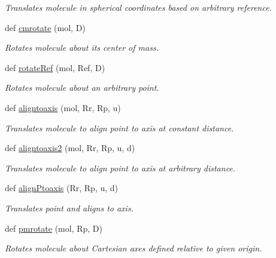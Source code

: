\begin{DoxyCompactItemize}
\begin{DoxyCompactList}\small\item\em Translates molecule in spherical coordinates based on arbitrary reference. \end{DoxyCompactList}\item 
def \hyperlink{namespacemolSimplify_1_1Scripts_1_1geometry_a891c57b819e0c6b2a00e9a495fc0dac9}{cmrotate} (mol, D)
\begin{DoxyCompactList}\small\item\em Rotates molecule about its center of mass. \end{DoxyCompactList}\item 
def \hyperlink{namespacemolSimplify_1_1Scripts_1_1geometry_ac0753e6f8d4fa1b2193cdbf99e3d1c8b}{rotate\+Ref} (mol, Ref, D)
\begin{DoxyCompactList}\small\item\em Rotates molecule about an arbitrary point. \end{DoxyCompactList}\item 
def \hyperlink{namespacemolSimplify_1_1Scripts_1_1geometry_ae639e596da3de910ae56f9ced7d336e9}{aligntoaxis} (mol, Rr, Rp, u)
\begin{DoxyCompactList}\small\item\em Translates molecule to align point to axis at constant distance. \end{DoxyCompactList}\item 
def \hyperlink{namespacemolSimplify_1_1Scripts_1_1geometry_ad1b4c0975cd5853ea6c66f707c5e55a5}{aligntoaxis2} (mol, Rr, Rp, u, d)
\begin{DoxyCompactList}\small\item\em Translates molecule to align point to axis at arbitrary distance. \end{DoxyCompactList}\item 
def \hyperlink{namespacemolSimplify_1_1Scripts_1_1geometry_a23714d51ef2a9e32e4c566497de8f506}{align\+Ptoaxis} (Rr, Rp, u, d)
\begin{DoxyCompactList}\small\item\em Translates point and aligns to axis. \end{DoxyCompactList}\item 
def \hyperlink{namespacemolSimplify_1_1Scripts_1_1geometry_a0c9d5009b8beb6cb765756fe15596191}{pmrotate} (mol, Rp, D)
\begin{DoxyCompactList}\small\item\em Rotates molecule about Cartesian axes defined relative to given origin. \end{DoxyCompactList}\end{DoxyCompactItemize}



